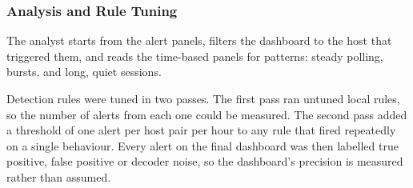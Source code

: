 \subsubsection{Analysis and Rule Tuning}

The analyst starts from the alert panels, filters the dashboard to the host that triggered them, and reads the time-based panels for patterns: steady polling, bursts, and long, quiet sessions.

Detection rules were tuned in two passes. The first pass ran untuned local rules, so the number of alerts from each one could be measured. The second pass added a threshold of one alert per host pair per hour to any rule that fired repeatedly on a single behaviour. Every alert on the final dashboard was then labelled true positive, false positive or decoder noise, so the dashboard's precision is measured rather than assumed.
